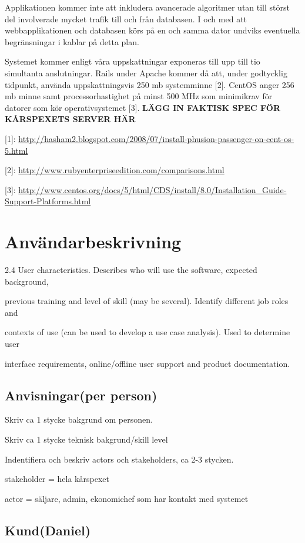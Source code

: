 \documentclass[a4paper, twoside, 11pt, titlepage]{article}
\begin{document}
	Applikationen kommer inte att inkludera avancerade algoritmer utan till störst del involverade mycket trafik till och från databasen. I och med att webbapplikationen och databasen körs på en och samma dator undviks eventuella begränsningar i kablar på detta plan.

	Systemet kommer enligt våra uppskattningar exponeras till upp till tio simultanta anslutningar. Rails under Apache kommer då att, under godtycklig tidpunkt, använda uppskattningsvis 250 mb systemminne [2]. CentOS anger 256 mb minne samt processorhastighet på minst 500 MHz som minimikrav för datorer som kör operativsystemet [3].  \textbf{LÄGG IN FAKTISK SPEC FÖR KÅRSPEXETS SERVER HÄR} 

	[1]: \url{http://hasham2.blogspot.com/2008/07/install-phusion-passenger-on-cent-os-5.html}

	[2]: \url{http://www.rubyenterpriseedition.com/comparisons.html}

	[3]: \url{http://www.centos.org/docs/5/html/CDS/install/8.0/Installation\_Guide-Support-Platforms.html}

\section{Användarbeskrivning}

2.4 User characteristics. Describes who will use the software, expected background, 

previous training and level of skill (may be several). Identify different job roles and 

contexts of use (can be used to develop a use case analysis). Used to determine user 

interface requirements, online/offline user support and product documentation.

	\subsection{Anvisningar(per person)}

	Skriv ca 1 stycke bakgrund om personen.

	Skriv ca 1 stycke teknisk bakgrund/skill level 

	Indentifiera och beskriv actors och stakeholders, ca 2-3 stycken.

	stakeholder = hela kårspexet

	actor = säljare, admin, ekonomichef som har kontakt med systemet

	\subsection{Kund(Daniel)}
\end{document}
